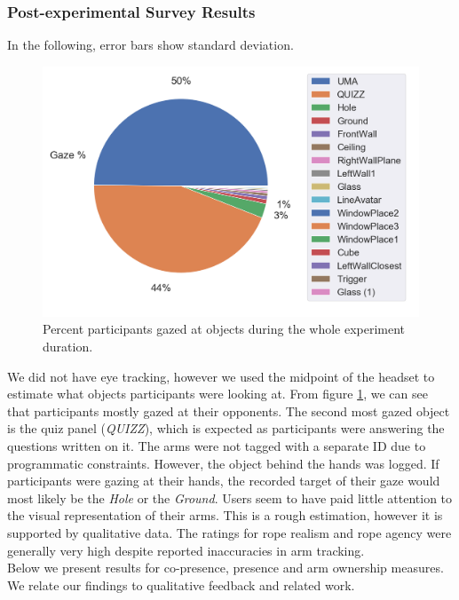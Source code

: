 \clearpage

\subsubsection{Post-experimental Survey Results}

In the following, error bars show standard deviation.
\begin{figure}[H]
 \centering
 \includegraphics[scale=0.5]{Files/Plots/gaze_plots.png}
 \caption{Percent participants gazed at objects during the whole experiment duration. }
\label{fig:gazePie}
\end{figure}
We did not have eye tracking, however we used the midpoint of the headset to estimate what objects participants were looking at. From figure \ref{fig:gazePie}, we can see that participants mostly gazed at their opponents. The second most gazed object is the quiz panel (\textit{QUIZZ}), which is expected as participants were answering the questions written on it.  The arms were not tagged with a separate ID due to programmatic constraints. However, the object behind the hands was logged. If participants were gazing at their hands, the recorded target of their gaze would most likely be the \textit{Hole} or the \textit{Ground}. Users seem to have paid little attention to the visual representation of their arms. This is a rough estimation, however it is supported by qualitative data. The ratings for rope realism and rope agency were generally very high despite reported inaccuracies in arm tracking.\\ 
Below we present results for co-presence, presence and arm ownership measures. We relate our findings to qualitative feedback and related work.

